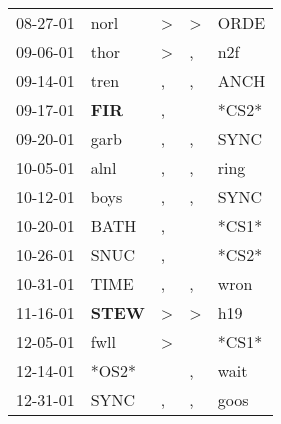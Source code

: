 \begin{supertabular}{p{0.07\textwidth}p{0.06\textwidth}p{0.02\textwidth}p{0.02\textwidth}p{0.06\textwidth}}
          08-27-01\textsuperscript{} &           norl\textsuperscript{} &     \textgreater &     \textgreater &           ORDE\textsuperscript{} \\
          09-06-01\textsuperscript{} &           thor\textsuperscript{} &     \textgreater &                , &            n2f\textsuperscript{} \\
          09-14-01\textsuperscript{} &           tren\textsuperscript{} &                , &                , &           ANCH\textsuperscript{} \\
          09-17-01\textsuperscript{} &   \textbf{FIR\textsuperscript{}} &                , &                  &                            *CS2* \\
          09-20-01\textsuperscript{} &           garb\textsuperscript{} &                , &                , &           SYNC\textsuperscript{} \\
          10-05-01\textsuperscript{} &           alnl\textsuperscript{} &                , &                , &           ring\textsuperscript{} \\
          10-12-01\textsuperscript{} &           boys\textsuperscript{} &                , &                , &           SYNC\textsuperscript{} \\
          10-20-01\textsuperscript{} &           BATH\textsuperscript{} &                , &                  &                            *CS1* \\
          10-26-01\textsuperscript{} &           SNUC\textsuperscript{} &                , &                  &                            *CS2* \\
          10-31-01\textsuperscript{} &           TIME\textsuperscript{} &                , &                , &           wron\textsuperscript{} \\
          11-16-01\textsuperscript{} &  \textbf{STEW\textsuperscript{}} &     \textgreater &     \textgreater &            h19\textsuperscript{} \\
          12-05-01\textsuperscript{} &           fwll\textsuperscript{} &     \textgreater &                  &                            *CS1* \\
          12-14-01\textsuperscript{} &                            *OS2* &                  &                , &           wait\textsuperscript{} \\
          12-31-01\textsuperscript{} &           SYNC\textsuperscript{} &                , &                , &           goos\textsuperscript{} \\

\end{supertabular}
